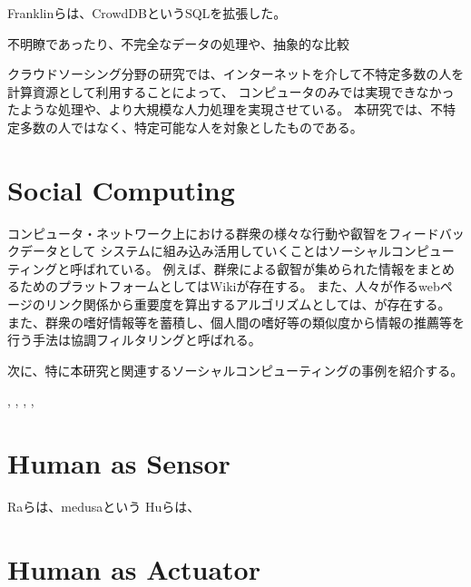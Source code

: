 Franklinらは、CrowdDBというSQLを拡張した。

不明瞭であったり、不完全なデータの処理や、抽象的な比較 \cite{crowddb}

\cite{cylog} \cite{crowdforge} \cite{community-based-crowdsourcing}

クラウドソーシング分野の研究では、インターネットを介して不特定多数の人を計算資源として利用することによって、
コンピュータのみでは実現できなかったような処理や、より大規模な人力処理を実現させている。
本研究では、不特定多数の人ではなく、特定可能な人を対象としたものである。

\section{Social Computing}\label{social-computing}

コンピュータ・ネットワーク上における群衆の様々な行動や叡智をフィードバックデータとして
システムに組み込み活用していくことはソーシャルコンピューティングと呼ばれている。
例えば、群衆による叡智が集められた情報をまとめるためのプラットフォームとしてはWiki\cite{wiki}が存在する。
また、人々が作るwebページのリンク関係から重要度を算出するアルゴリズムとしては、\cite{pagerank}が存在する。
また、群衆の嗜好情報等を蓄積し、個人間の嗜好等の類似度から情報の推薦等を行う手法は協調フィルタリングと呼ばれる\cite{collaborative-filtering}。

次に、特に本研究と関連するソーシャルコンピューティングの事例を紹介する。

\cite{dog}, \cite{jabberwocky}, \cite{social-machines},
\cite{personal-api},

\section{Human as Sensor}\label{human-as-sensor}

\cite{prism} \cite{moboq} Raらは、medusa\cite{Ra-medusa}という
Huらは、\cite{Hu:mobilecrowdsensing}

\section{Human as Actuator}\label{human-as-actuator}

\cite{hapticturk} \cite{sharedo} \cite{recipe-programming} \cite{cooky}
